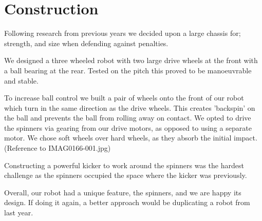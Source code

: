 \section{Construction}

Following research from previous years we decided upon a large chassis for;
strength, and size when defending against penalties. 

We designed a three wheeled robot with two large drive wheels at the front with
a ball bearing at the rear. Tested on the pitch this proved to be manoeuvrable
and stable. 

To increase ball control we built a pair of  wheels onto the front of
our robot which turn in the same direction as the drive wheels. This creates
'backspin' on the ball and prevents the ball from rolling away on contact.  We
opted to drive the spinners via gearing from our drive motors, as opposed to
using a separate motor.  We chose soft wheels over hard wheels, as they
absorb the initial impact. (Reference to IMAG0166-001.jpg)

Constructing a powerful kicker to work around the spinners was the
hardest challenge as the spinners occupied the space where the kicker was
previously.

Overall, our robot had a unique feature,
the spinners, and we are happy its design. If doing it again, a better
approach would be duplicating a robot from last year.
